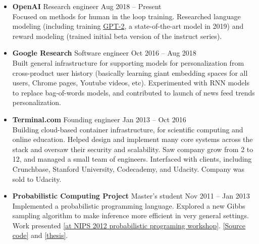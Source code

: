 \documentclass[11 pt]{article}
\begin{document}
\begin{itemize}

\item \textbf{OpenAI} Research engineer \hfill Aug 2018 -- Present \\
Focused on methods for human in the loop training.  Researched language modeling (including training \href{https://openai.com/blog/better-language-models/}{GPT-2}, a state-of-the-art model in 2019) and reward modeling (trained initial beta version of the instruct series).


\item \textbf{Google Research} Software engineer \hfill Oct 2016 -- Aug 2018 \\
Built general infrastructure
for supporting models for personalization from cross-product user history (basically learning giant embedding spaces for all users, Chrome pages, Youtube videos, etc).
Experimented with RNN models to replace bag-of-words models, and contributed to launch of news feed trends personalization.

\item \textbf{Terminal.com} Founding engineer \hfill Jan 2013 -- Oct 2016 \\
Building cloud-based container infrastructure, for scientific computing and online education.
Helped design and implement many core systems across the stack %
and oversaw their security and scalability.
Saw company grow from 2 to 12, and managed a small team of engineers.
Interfaced with clients, including Crunchbase, Stanford University, Codecademy, and Udacity.
Company was sold to Udacity.

\item \textbf{Probabilistic Computing Project} Master's student \hfill Nov 2011 -- Jan 2013 \\
Implemented a probabilistic programming language.
Explored a new Gibbs sampling algorithm to make inference more efficient in very general settings.
Work presented \href{http://probabilistic-programming.org/wiki/NIPS*2012_Workshop/Schedule#poster-wu}{[at NIPS 2012 probabilistic programing workshop]}.
\href{https://github.com/WuTheFWasThat/PyChurch.}{[Source code]}
and
\href{https://github.com/WuTheFWasThat/PyChurch/blob/master/papers/MEng\%20thesis.pdf}{[thesis]}.



\end{itemize}
\end{document}
